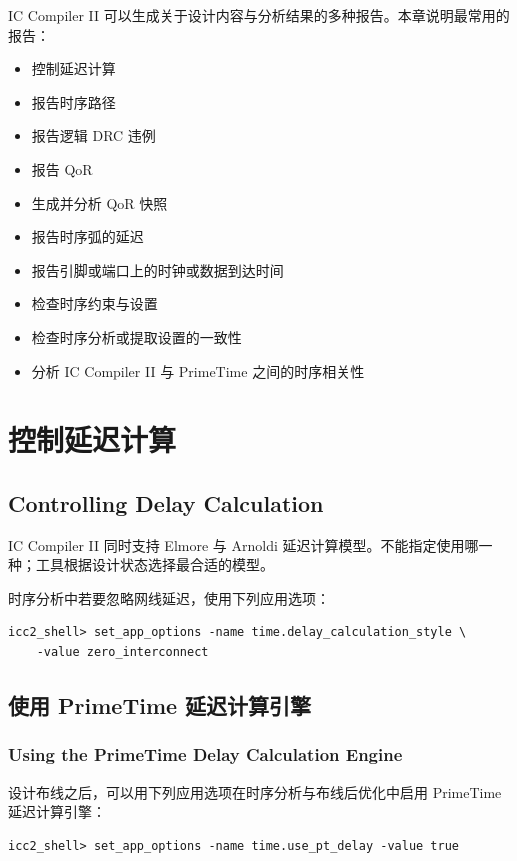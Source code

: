 \label{chap:reports}

IC Compiler II 可以生成关于设计内容与分析结果的多种报告。本章说明最常用的报告：
\begin{itemize}
  \item 控制延迟计算
  \item 报告时序路径
  \item 报告逻辑 DRC 违例
  \item 报告 QoR
  \item 生成并分析 QoR 快照
  \item 报告时序弧的延迟
  \item 报告引脚或端口上的时钟或数据到达时间
  \item 检查时序约束与设置
  \item 检查时序分析或提取设置的一致性
  \item 分析 IC Compiler II 与 PrimeTime 之间的时序相关性
\end{itemize}

\section{控制延迟计算}
\subsection*{Controlling Delay Calculation}

IC Compiler II 同时支持 Elmore 与 Arnoldi 延迟计算模型。不能指定使用哪一种；工具根据设计状态选择最合适的模型。

时序分析中若要忽略网线延迟，使用下列应用选项：
\begin{lstlisting}
icc2_shell> set_app_options -name time.delay_calculation_style \
    -value zero_interconnect
\end{lstlisting}

\subsection{使用 PrimeTime 延迟计算引擎}
\subsubsection*{Using the PrimeTime Delay Calculation Engine}

设计布线之后，可以用下列应用选项在时序分析与布线后优化中启用 PrimeTime 延迟计算引擎：
\begin{lstlisting}
icc2_shell> set_app_options -name time.use_pt_delay -value true
\end{lstlisting}

